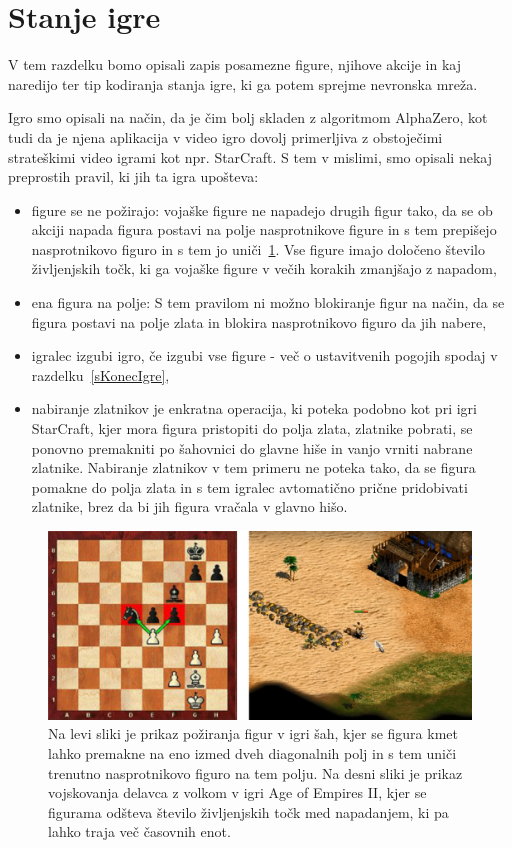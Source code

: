 \documentclass[a4paper, 12pt]{book}
\begin{document}
\section{Stanje igre}
\label{stanjeigre}
V tem razdelku bomo opisali zapis posamezne figure, njihove akcije in kaj naredijo ter tip kodiranja stanja igre, ki ga potem sprejme nevronska mreža.

Igro smo opisali na način, da je čim bolj skladen z algoritmom AlphaZero, kot tudi da je njena aplikacija v video igro dovolj primerljiva z obstoječimi strateškimi video igrami kot npr. StarCraft.
S tem v mislimi, smo opisali nekaj preprostih pravil, ki jih ta igra upošteva:
\begin{itemize}
	\item figure se ne požirajo: vojaške figure ne napadejo drugih figur tako, da se ob akciji napada figura postavi na polje nasprotnikove figure in s tem prepišejo nasprotnikovo figuro in s tem jo uniči~\ref{picPoziranjeFigur}. 
	Vse figure imajo določeno število življenjskih točk, ki ga vojaške figure v večih korakih zmanjšajo z napadom,
	\item ena figura na polje: S tem pravilom ni možno blokiranje figur na način, da se figura postavi na polje zlata in blokira nasprotnikovo figuro da jih nabere,
	\item igralec izgubi igro, če izgubi vse figure - več o ustavitvenih pogojih spodaj v razdelku~\ref{sKonecIgre},
	\item nabiranje zlatnikov je enkratna operacija, ki poteka podobno kot pri igri StarCraft, kjer mora figura pristopiti do polja zlata, zlatnike pobrati, se ponovno premakniti po šahovnici do glavne hiše in vanjo vrniti nabrane zlatnike.
	Nabiranje zlatnikov v tem primeru ne poteka tako, da se figura pomakne do polja zlata in s tem igralec avtomatično prične pridobivati zlatnike, brez da bi jih figura vračala v glavno hišo.
\end{itemize}

\begin{figure}[h!]
	\begin{center}
		\includegraphics[width=1\textwidth]{photos/horizontal_health.pdf}
	\end{center}
	\caption{Na levi sliki je prikaz požiranja figur v igri šah, kjer se figura kmet lahko premakne na eno izmed dveh diagonalnih polj in s tem uniči trenutno nasprotnikovo figuro na tem polju. 
		Na desni sliki je prikaz vojskovanja delavca z volkom v igri Age of Empires II, kjer se figurama odšteva število življenjskih točk med napadanjem, ki pa lahko traja več časovnih enot. }
	\label{picPoziranjeFigur}
\end{figure}
\end{document}
